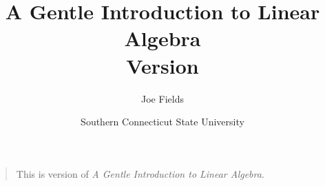 \documentclass[dvips,12pt,twoside]{book}
\begin{document}
\frontmatter

\title{A Gentle Introduction to Linear Algebra\\ {\small Version \versionNum }}
\author{Joe Fields}
\date{Southern Connecticut State University}

\maketitle

\clearpage



\clearpage

\rule{0pt}{0pt}

\vfill

\begin{quote}

   This is version \versionNum of {\em A Gentle Introduction to Linear Algebra}.  
  
\end{quote}

\vfill



\vfill
\clearpage

\tableofcontents

\listoffigures

\listoftables



\mainmatter








\backmatter



{}%


{}
\printindex
\end{document}
